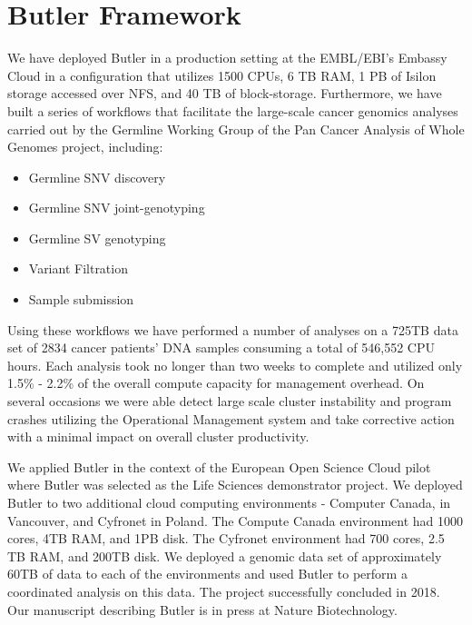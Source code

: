 \section{Butler Framework}

We have deployed Butler in a production setting at the EMBL/EBI's Embassy Cloud in a configuration that utilizes 1500 CPUs, 6 TB RAM, 1 PB of Isilon storage accessed over NFS, and 40 TB of block-storage. Furthermore, we have built a series of workflows that facilitate the large-scale cancer genomics analyses carried out by the Germline Working Group of the Pan Cancer Analysis of Whole Genomes project, including:

\begin{itemize}
\item Germline SNV discovery
\item Germline SNV joint-genotyping
\item Germline SV genotyping
\item Variant Filtration
\item Sample submission
\end{itemize}

Using these workflows we have performed a number of analyses on a 725TB data set of 2834 cancer patients' DNA samples consuming a total of 546,552 CPU hours. Each analysis took no longer than two weeks to complete and utilized only 1.5\% - 2.2\% of the overall compute capacity for management overhead. On several occasions we were able detect large scale cluster instability and program crashes utilizing the Operational Management system and take corrective action with a minimal impact on overall cluster productivity. 

We applied Butler in the context of the European Open Science Cloud pilot where Butler was selected as the Life Sciences demonstrator project. We deployed Butler to two additional cloud computing environments - Computer Canada, in Vancouver, and Cyfronet in Poland. The Compute Canada environment had 1000 cores, 4TB RAM, and 1PB disk. The Cyfronet environment had 700 cores, 2.5 TB RAM, and 200TB disk. We deployed a genomic data set of approximately 60TB of data to each of the environments and used Butler to perform a coordinated analysis on this data. The project successfully concluded in 2018. Our manuscript describing Butler is in press at Nature Biotechnology\autocite{yakneen2017enabling}.

